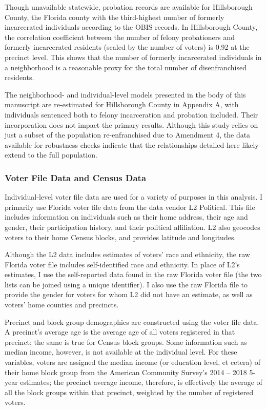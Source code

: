 \documentclass[
  12pt,
]{article}
\begin{document}
Though unavailable statewide, probation records are available for Hillsborough County, the Florida county with the third-highest number of formerly incarcerated individuals according to the OBIS records. In Hillsborough County, the correlation coefficient between the number of felony probationers and formerly incarcerated residents (scaled by the number of voters) is 0.92 at the precinct level. This shows that the number of formerly incarcerated individuals in a neighborhood is a reasonable proxy for the total number of disenfranchised residents.

The neighborhood- and individual-level models presented in the body of this manuscript are re-estimated for Hillsborough County in Appendix A, with individuals sentenced both to felony incarceration and probation included. Their incorporation does not impact the primary results. Although this study relies on just a subset of the population re-enfranchised due to Amendment 4, the data available for robustness checks indicate that the relationships detailed here likely extend to the full population.

\hypertarget{voter-file-data-and-census-data}{%
\subsubsection*{Voter File Data and Census Data}\label{voter-file-data-and-census-data}}

Individual-level voter file data are used for a variety of purposes in this analysis. I primarily use Florida voter file data from the data vendor L2 Political. This file includes information on individuals such as their home address, their age and gender, their participation history, and their political affiliation. L2 also geocodes voters to their home Census blocks, and provides latitude and longitudes.

Although the L2 data includes estimates of voters' race and ethnicity, the raw Florida voter file includes self-identified race and ethnicity. In place of L2's estimates, I use the self-reported data found in the raw Florida voter file (the two lists can be joined using a unique identifier). I also use the raw Florida file to provide the gender for voters for whom L2 did not have an estimate, as well as voters' home counties and precincts.

Precinct and block group demographics are constructed using the voter file data. A precinct's average age is the average age of all voters registered in that precinct; the same is true for Census block groups. Some information such as median income, however, is not available at the individual level. For these variables, voters are assigned the median income (or education level, et cetera) of their home block group from the American Community Survey's 2014 -- 2018 5-year estimates; the precinct average income, therefore, is effectively the average of all the block groups within that precinct, weighted by the number of registered voters.
\end{document}
